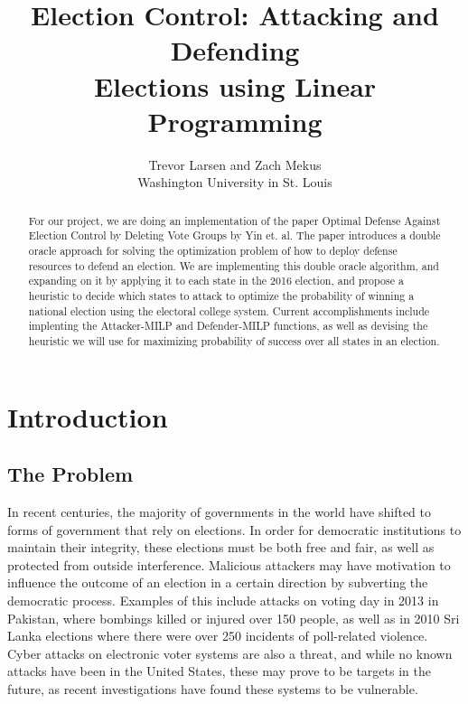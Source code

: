 \documentclass[letterpaper]{article} %
\begin{document}
%
\title{Election Control: Attacking and Defending\\ Elections using Linear Programming}
\author{Trevor Larsen and Zach Mekus\\
Washington University in St. Louis
}
\maketitle
\begin{abstract}
For our project, we are doing an implementation of the paper Optimal Defense Against Election Control by Deleting Vote Groups by Yin et. al. The paper introduces a double oracle approach for solving the optimization problem of how to deploy defense resources to defend an election. We are implementing this double oracle algorithm, and expanding on it by applying it to each state in the 2016 election, and propose a heuristic to decide which states to attack to optimize the probability of winning a national election using the electoral college system. Current accomplishments include implenting the Attacker-MILP and Defender-MILP functions, as well as devising the heuristic we will use for maximizing probability of success over all states in an election.
\end{abstract}

\section{Introduction}
\subsection{The Problem}

In recent centuries, the majority of governments in the world have shifted to forms of government that rely on elections. In order for democratic institutions to maintain their integrity, these elections must be both free and fair, as well as protected from outside interference. Malicious attackers may have motivation to influence the outcome of an election in a certain direction by subverting the democratic process. Examples of this include attacks on voting day in 2013 in Pakistan, where bombings killed or injured over 150 people, as well as in 2010 Sri Lanka elections where there were over 250 incidents of poll-related violence. Cyber attacks on electronic voter systems are also a threat, and while no known attacks have been  in the United States, these may prove to be targets in the future, as recent investigations have found these systems to be vulnerable. 
\end{document}
